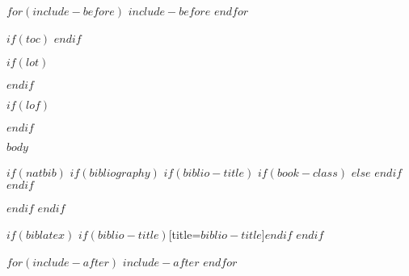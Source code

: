\documentclass[
$if(fontsize)$
$fontsize$,
$endif$
$if(lang)$
$lang$,
$endif$
$if(papersize)$
$papersize$,
$endif$
$for(classoption)$
$classoption$$sep$,
$endfor$
]{$documentclass$}
\begin{document}
$for(include-before)$
$include-before$
$endfor$

$if(toc)$
\break
\break
{
\hypersetup{linkcolor=$if(toccolor)$$toccolor$$else$black$endif$}
\setcounter{tocdepth}{$toc-depth$}
\tableofcontents
}
$endif$

$if(lot)$
\listoftables
$endif$

$if(lof)$
\listoffigures
$endif$

$body$

$if(natbib)$
$if(bibliography)$
$if(biblio-title)$
$if(book-class)$
\renewcommand\bibname{$biblio-title$}
$else$
\renewcommand\refname{$biblio-title$}
$endif$
$endif$

$endif$
$endif$

$if(biblatex)$
\printbibliography$if(biblio-title)$[title=$biblio-title$]$endif$
$endif$

$for(include-after)$
$include-after$
$endfor$
\end{document}
